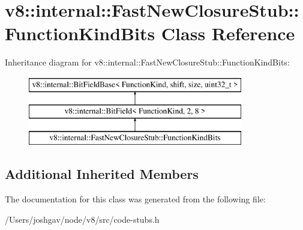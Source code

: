 \hypertarget{classv8_1_1internal_1_1_fast_new_closure_stub_1_1_function_kind_bits}{}\section{v8\+:\+:internal\+:\+:Fast\+New\+Closure\+Stub\+:\+:Function\+Kind\+Bits Class Reference}
\label{classv8_1_1internal_1_1_fast_new_closure_stub_1_1_function_kind_bits}
Inheritance diagram for v8\+:\+:internal\+:\+:Fast\+New\+Closure\+Stub\+:\+:Function\+Kind\+Bits\+:\begin{figure}[H]
\begin{center}
\leavevmode
\includegraphics[height=3.000000cm]{classv8_1_1internal_1_1_fast_new_closure_stub_1_1_function_kind_bits}
\end{center}
\end{figure}
\subsection*{Additional Inherited Members}


The documentation for this class was generated from the following file\+:\begin{DoxyCompactItemize}
\item 
/\+Users/joshgav/node/v8/src/code-\/stubs.\+h\end{DoxyCompactItemize}

